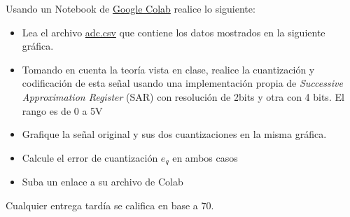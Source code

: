 \documentclass[12pt]{article}
\begin{document}
\setlength{\parindent}{0em}

Usando un Notebook de \href{https://colab.research.google.com/}{Google Colab} realice lo siguiente:

\begin{itemize}
    \item Lea el archivo \href{https://estudianteccr-my.sharepoint.com/:u:/g/personal/prof_juan_rojas_estudiantec_cr/EcuXJs2cG21HnH02L5fq5OMBOoznw5P7fMkWscsfJdJjgQ?e=8s1NAe}{adc.csv} que contiene los datos mostrados en la siguiente gráfica.
    \begin{figure}[H]
        \centering
        \caption{}
        \label{fig:signal}
    \end{figure}
    \item Tomando en cuenta la teoría vista en clase, realice la cuantización y codificación de esta señal usando una implementación propia de \emph{Successive Approximation Register} (SAR) con resolución de 2bits y otra con 4 bits. El rango es de 0 a 5\si{V}
    \item Grafique la señal original y sus dos cuantizaciones en la misma gráfica.
    \item Calcule el error de cuantización $e_q$ en ambos casos
    \item Suba un enlace a su archivo de Colab
\end{itemize}

Cualquier entrega tardía se califica en base a 70. 

% 
% 
\end{document}
